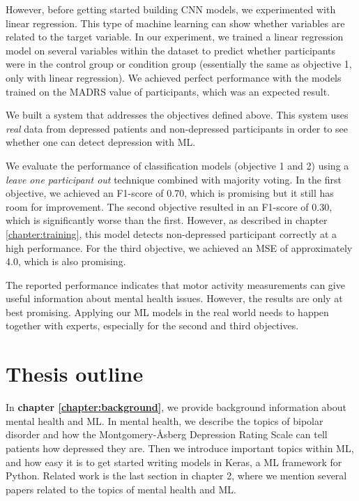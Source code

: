 However, before getting started building CNN models, we experimented with linear regression. This type of machine learning can show whether variables are related to the target variable. In our experiment, we trained a linear regression model on several variables within the dataset to predict whether participants were in the control group or condition group (essentially the same as objective 1, only with linear regression). We achieved perfect performance with the models trained on the MADRS value of participants, which was an expected result.

We built a system that addresses the objectives defined above. This system uses \textit{real} data from depressed patients and non-depressed participants in order to see whether one can detect depression with ML.

We evaluate the performance of classification models (objective 1 and 2) using a \textit{leave one participant out} technique combined with majority voting. In the first objective, we achieved an F1-score of 0.70, which is promising but it still has room for improvement. The second objective resulted in an F1-score of 0.30, which is significantly worse than the first. However, as described in chapter \ref{chapter:training}, this model detects non-depressed participant correctly at a high performance. For the third objective, we achieved an MSE of approximately 4.0, which is also promising. 

The reported performance indicates that motor activity measurements can give useful information about mental health issues. However, the results are only at best promising. Applying our ML models in the real world needs to happen together with experts, especially for the second and third objectives. 

\section{Thesis outline}
In \textbf{chapter \ref{chapter:background}}, we provide background information about mental health and ML. In mental health, we describe the topics of bipolar disorder and how the Montgomery-Åsberg Depression Rating Scale can tell patients how depressed they are. Then we introduce important topics within ML, and how easy it is to get started writing models in Keras, a ML framework for Python. Related work is the last section in chapter 2, where we mention several papers related to the topics of mental health and ML. \\

